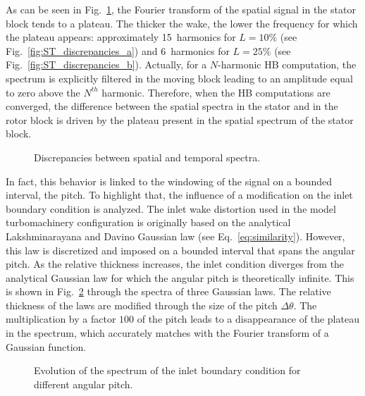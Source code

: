 As can be seen in Fig.~\ref{fig:ST_discrepancies}, 
the Fourier transform of the spatial signal in the stator block tends to a plateau. 
The thicker the wake, 
the lower the frequency for which the plateau appears: 
approximately 15~harmonics for $L=10\%$
(see Fig.~\ref{fig:ST_discrepancies_a}) and 
6~harmonics for $L=25\%$ (see Fig.~\ref{fig:ST_discrepancies_b}).
Actually, for a $N$-harmonic HB computation, the spectrum is 
explicitly filtered in the moving block leading to an amplitude 
equal to zero above the $N^{th}$ harmonic. 
Therefore, when the HB computations are converged, the difference between the spatial 
spectra in the stator and in the rotor block is driven by the plateau present 
in the spatial spectrum of the stator block.
\begin{figure}[htp]
  \begin{center}
  \end{center}
  \caption{Discrepancies between spatial and temporal spectra.}
  \label{fig:ST_discrepancies}
\end{figure}

In fact, this behavior is linked to the windowing of the signal on 
a bounded interval, the pitch. To highlight that, the influence of 
a modification on the inlet boundary condition is analyzed.
The inlet wake distortion used in the model turbomachinery configuration is 
originally based on the analytical Lakshminarayana and Davino 
Gaussian law (see Eq.~\eqref{eq:similarity}). However, 
this law is discretized and imposed on a bounded interval 
that spans the angular pitch. As the relative thickness 
increases, the inlet condition diverges from the analytical 
Gaussian law for which the angular pitch is theoretically 
infinite. This is shown in Fig.~\ref{fig:inlet_law_fft} 
through the spectra of three Gaussian laws. The relative 
thickness of the laws are modified through the size 
of the pitch $\Delta \theta$. The multiplication by a factor $100$ 
of the pitch leads to a disappearance of the plateau 
in the spectrum, which accurately matches with the 
Fourier transform of a Gaussian function. 
\begin{figure}[htp]
  \centering
  \caption{Evolution of the spectrum of the inlet boundary condition for different angular pitch.}
  \label{fig:inlet_law_fft}
\end{figure}

